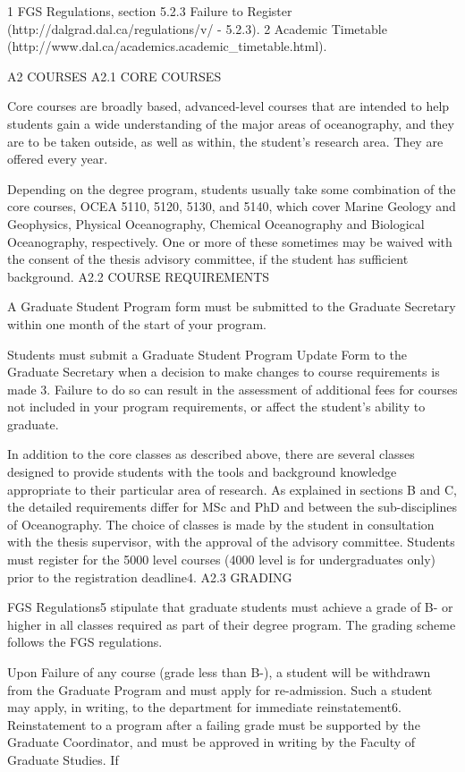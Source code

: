 1 FGS Regulations, section 5.2.3 Failure to Register (http://dalgrad.dal.ca/regulations/v/ - 5.2.3).
2 Academic Timetable (http://www.dal.ca/academics.academic_timetable.html).
 

A2	COURSES
A2.1	CORE COURSES

Core courses are broadly based, advanced-level courses that are intended to help students gain a wide understanding of the major areas of oceanography, and they are to be taken outside, as well as within, the student’s research area. They are offered every year.

Depending on the degree program, students usually take some combination of the core courses, OCEA 5110, 5120, 5130, and 5140, which cover Marine Geology and Geophysics, Physical Oceanography, Chemical Oceanography and Biological Oceanography, respectively. One or more of these sometimes may be waived with the consent of the thesis advisory committee, if the student has sufficient background.
A2.2	COURSE REQUIREMENTS

A Graduate Student Program form must be submitted to the Graduate Secretary within one month of the start of your program.

Students must submit a Graduate Student Program Update Form to the Graduate Secretary when a decision to make changes to course requirements is made 3. Failure to do so can result in the assessment of additional fees for courses not included in your program requirements, or affect the student’s ability to graduate.

In addition to the core classes as described above, there are several classes designed to provide students with the tools and background knowledge appropriate to their particular area of research. As explained in sections B and C, the detailed requirements differ for MSc and PhD and between the sub-disciplines of Oceanography. The choice of classes is made by the student in consultation with the thesis supervisor, with the approval of the advisory committee. Students must register for the 5000 level
courses (4000 level is for undergraduates only) prior to the registration deadline4.
A2.3	GRADING

FGS Regulations5 stipulate that graduate students must achieve a grade of B- or higher in all classes required as part of their degree program.  The grading scheme follows the FGS regulations.

Upon Failure of any course (grade less than B-), a student will be withdrawn from the Graduate Program and must apply for re-admission. Such a student may apply, in writing, to the department for immediate reinstatement6. Reinstatement to a program after a failing grade must be supported by the Graduate Coordinator, and must be approved in writing by the Faculty of Graduate Studies. If

